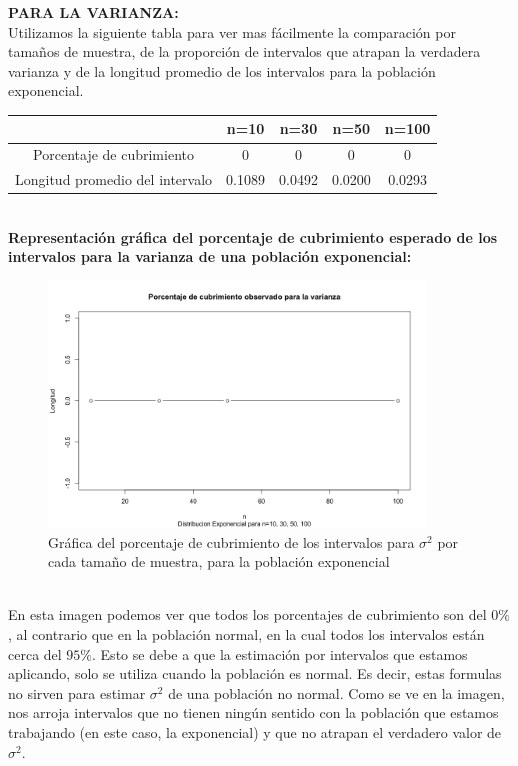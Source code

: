 \documentclass[letterpaper,12pt,onecolumn,titlepage]{article}
\begin{document}
\pagebreak\textbf{PARA LA VARIANZA:}
~\\ Utilizamos la siguiente tabla para ver mas f\'{a}cilmente la comparaci\'{o}n por tama\~{n}os de muestra, de la proporci\'{o}n de intervalos que atrapan la verdadera varianza y de la longitud promedio de los intervalos para la poblaci\'{o}n exponencial.
\begin{center}
\begin{tabular}{|c|c|c|c|c|}
\hline 
\rule[-1ex]{0pt}{2.5ex}  & n=10 & n=30 & n=50 & n=100 \\ 
\hline 
\rule[-1ex]{0pt}{2.5ex} Porcentaje de cubrimiento & 0 & 0 & 0 & 0 \\ 
\hline 
\rule[-1ex]{0pt}{2.5ex} Longitud promedio del intervalo & 0.1089 & 0.0492 & 0.0200 & 0.0293 \\ 
\hline 
\end{tabular} 
\end{center}
~\\\textbf{Representaci\'{o}n gr\'{a}fica del porcentaje de cubrimiento esperado de los intervalos para la varianza de una poblaci\'{o}n exponencial:}
~\\ \begin{figure}[!h]
    \begin{center}
        \includegraphics[width=10cm]{Figuras/Pc2.png}
        \caption{Gr\'{a}fica del porcentaje de cubrimiento de los intervalos para $\sigma^2$ por cada tama\~{n}o de muestra, para la poblaci\'{o}n exponencial}
        \label{fig:Densidad}
    \end{center}
\end{figure}
~\\ En esta imagen podemos ver que todos los porcentajes de cubrimiento son del $0\%$, al contrario que en la poblaci\'{o}n normal, en la cual todos los intervalos est\'{a}n cerca del $95\%$. Esto se debe a que la estimaci\'{o}n por intervalos que estamos aplicando, solo se utiliza cuando la poblaci\'{o}n es normal. Es decir, estas formulas no sirven para estimar $\sigma^2$ de una poblaci\'{o}n no normal. Como se ve en la imagen, nos arroja intervalos que no tienen ning\'{u}n sentido con la poblaci\'{o}n que estamos trabajando (en este caso, la exponencial) y que no atrapan el verdadero valor de $\sigma^2$.
\end{document}
